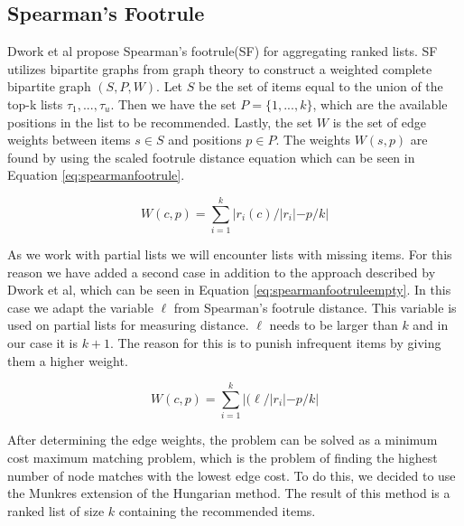 \subsection{Spearman's Footrule}\label{sec:spearmansfootrule}
Dwork et al propose Spearman's footrule(SF) for aggregating ranked lists\citep{rank:aggregation}.
SF utilizes bipartite graphs from graph theory to construct a weighted complete bipartite graph $(S,P,W)$.
Let $S$ be the set of items equal to the union of the top-k lists $\tau_1, ..., \tau_u$. Then we have the set $P = \{1,...,k\}$, which are the available positions in the list to be recommended. Lastly, the set $W$ is the set of edge weights between items $s\in S$ and positions $p\in P$. The weights $W(s,p)$ are found by using the scaled footrule distance equation which can be seen in Equation \ref{eq:spearmanfootrule}\cite{rank:aggregation}.
 
\begin{equation}\label{eq:spearmanfootrule}
W(c,p) = \displaystyle\sum_{i=1}^{k} |r_i(c)/|r_i| - p/k|
\end{equation}

As we work with partial lists we will encounter lists with missing items. For this reason we have added a second case in addition to the approach described by Dwork et al, which can be seen in Equation \ref{eq:spearmanfootruleempty}. In this case we adapt the variable $\ell$ from Spearman's footrule distance. This variable is used on partial lists for measuring distance. $\ell$ needs to be larger than $k$ and in our case it is $k + 1$. The reason for this is to punish infrequent items by giving them a higher weight.

\begin{equation}\label{eq:spearmanfootruleempty}
W(c,p) = \displaystyle\sum_{i=1}^{k} |(\ell/|r_i| - p/k|
\end{equation}

After determining the edge weights, the problem can be solved as a minimum cost maximum matching problem, which is the problem of finding the highest number of node matches with the lowest edge cost. To do this, we decided to use the Munkres extension of the Hungarian method\cite{Munkres1957}. The result of this method is a ranked list of size $k$ containing the recommended items.
